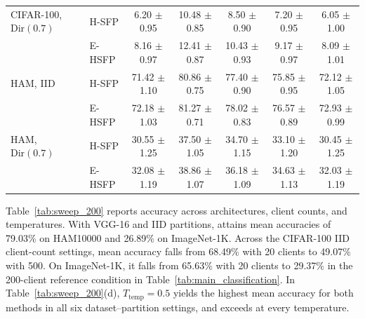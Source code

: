 \begin{table}[t]
\begin{minipage}[t]{0.56\textwidth}
{\begin{tabular}{@{}llccccc@{}}
\addlinespace[2pt]

CIFAR-100, $\mathrm{Dir}(0.7)$ & H-SFP
& 6.20 {\scriptsize $\pm$ 0.95}
& 10.48 {\scriptsize $\pm$ 0.85}
& 8.50 {\scriptsize $\pm$ 0.90}
& 7.20 {\scriptsize $\pm$ 0.95}
& 6.05 {\scriptsize $\pm$ 1.00} \\

 & E-HSFP
& 8.16 {\scriptsize $\pm$ 0.97}
& 12.41 {\scriptsize $\pm$ 0.87}
& 10.43 {\scriptsize $\pm$ 0.93}
& 9.17 {\scriptsize $\pm$ 0.97}
& 8.09 {\scriptsize $\pm$ 1.01} \\

\addlinespace[2pt]

HAM, IID & H-SFP
& 71.42 {\scriptsize $\pm$ 1.10}
& 80.86 {\scriptsize $\pm$ 0.75}
& 77.40 {\scriptsize $\pm$ 0.90}
& 75.85 {\scriptsize $\pm$ 0.95}
& 72.12 {\scriptsize $\pm$ 1.05} \\

 & E-HSFP
& 72.18 {\scriptsize $\pm$ 1.03}
& 81.27 {\scriptsize $\pm$ 0.71}
& 78.02 {\scriptsize $\pm$ 0.83}
& 76.57 {\scriptsize $\pm$ 0.89}
& 72.93 {\scriptsize $\pm$ 0.99} \\

\addlinespace[2pt]

HAM, $\mathrm{Dir}(0.7)$ & H-SFP
& 30.55 {\scriptsize $\pm$ 1.25}
& 37.50 {\scriptsize $\pm$ 1.05}
& 34.70 {\scriptsize $\pm$ 1.15}
& 33.10 {\scriptsize $\pm$ 1.20}
& 30.45 {\scriptsize $\pm$ 1.25} \\

 & E-HSFP
& 32.08 {\scriptsize $\pm$ 1.19}
& 38.86 {\scriptsize $\pm$ 1.07}
& 36.18 {\scriptsize $\pm$ 1.09}
& 34.63 {\scriptsize $\pm$ 1.13}
& 32.03 {\scriptsize $\pm$ 1.19} \\

\bottomrule
\end{tabular}
}
\end{minipage}
\end{table}

Table~\ref{tab:sweep_200} reports accuracy across architectures, client counts, and temperatures. With VGG-16 and IID partitions, \ehsfp{} attains mean accuracies of 79.03\% on HAM10000 and 26.89\% on ImageNet-1K. Across the CIFAR-100 IID client-count settings, mean accuracy falls from 68.49\% with 20 clients to 49.07\% with 500. On ImageNet-1K, it falls from 65.63\% with 20 clients to 29.37\% in the 200-client reference condition in Table~\ref{tab:main_classification}. In Table~\ref{tab:sweep_200}(d), $T_{\mathrm{temp}}=0.5$ yields the highest mean accuracy for both methods in all six dataset--partition settings, and \ehsfp{} exceeds \hsfp{} at every temperature.